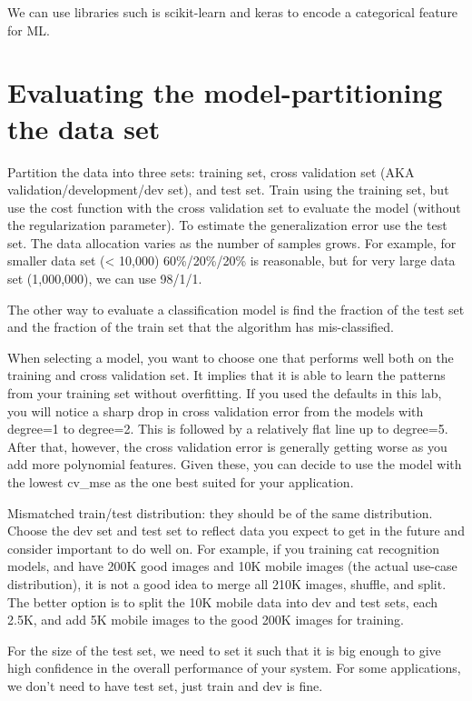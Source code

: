 \documentclass[12pt]{report}
\begin{document}
We can use libraries such is scikit-learn and keras to encode a categorical feature for ML.

\section{Evaluating the model-partitioning the data set}
\label{sec:dist}

Partition the data into three sets: training set, cross validation set (AKA validation/development/dev set), and test set. Train using the training set, but use the cost function with the cross validation set to evaluate the model (without the regularization parameter). To estimate the generalization error use the test set. The data allocation varies as the number of samples grows. For example, for smaller data set (< 10,000) 60\%/20\%/20\% is reasonable, but for very large data set (1,000,000), we can use 98/1/1.

The other way to evaluate a classification model is find the fraction of the test set and the fraction of the train set that the algorithm has mis-classified.

When selecting a model, you want to choose one that performs well both on the training and cross validation set. It implies that it is able to learn the patterns from your training set without overfitting. If you used the defaults in this lab, you will notice a sharp drop in cross validation error from the models with degree=1 to degree=2. This is followed by a relatively flat line up to degree=5. After that, however, the cross validation error is generally getting worse as you add more polynomial features. Given these, you can decide to use the model with the lowest cv\_mse as the one best suited for your application.

Mismatched train/test distribution: they should be of the same distribution. Choose the dev set and test set to reflect data you expect to get in the future and consider important to do well on. For example, if you training cat recognition models, and have 200K good images and 10K mobile images (the actual use-case distribution), it is not a good idea to merge all 210K images, shuffle, and split. The better option is to split the 10K mobile data into dev and test sets, each 2.5K, and add 5K mobile images to the good 200K images for training.

For the size of the test set, we need to set it such that it is big enough to give high confidence in the overall performance of your system. For some applications, we don't need to have test set, just train and dev is fine.
\end{document}
